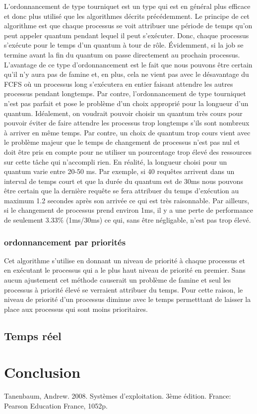 \documentclass{article}
\begin{document}
L'ordonnancement de type tourniquet est un type qui est en général plus efficace et donc plus utilisé que les algorithmes décrits précédemment. Le principe de cet algorithme est que chaque processus se voit attribuer une période de temps qu'on peut appeler quantum pendant lequel il peut s'exécuter. Donc, chaque processus s'exécute pour le temps d'un quantum à tour de rôle. Évidemment, si la job se termine avant la fin du quantum on passe directement au prochain processus. L'avantage de ce type d'ordonnancement est le fait que nous pouvons être certain qu'il n'y aura pas de famine et, en plus, cela ne vient pas avec le désavantage du FCFS où un processus long s'exécutera en entier faisant attendre les autres processus pendant longtemps. Par contre, l'ordonnancement de type tourniquet n'est pas parfait et pose le problème d'un choix approprié pour la longueur d'un quantum. Idéalement, on voudrait pouvoir choisir un quantum très cours pour pouvoir éviter de faire attendre les processus trop longtemps s'ils sont nombreux à arriver en même temps. Par contre, un choix de quantum trop cours vient avec le problème majeur que le temps de changement de processus n'est pas nul et doit être pris en compte pour ne utiliser un pourcentage trop élevé des ressources sur cette tâche qui n'accompli rien.
\newline
\newline
En réalité, la longueur choisi pour un quantum varie entre 20-50 ms. Par exemple, si 40 requêtes arrivent dans un interval de temps court et que la durée du quantum est de 30ms nous pouvons être certain que la dernière requête se fera attribuer du temps d'exécution au maximum 1.2 secondes après son arrivée ce qui est très raisonnable. Par ailleurs, si le changement de processus prend environ 1ms, il y a une perte de performance de seulement 3.33\% (1ms/30ms) ce qui, sans être négligable, n'est pas trop élevé.

\subsubsection{ordonnancement par priorités}

Cet algorithme s'utilise en donnant un niveau de priorité à chaque processus et en exécutant le processus qui a le plus haut niveau de priorité en premier. Sans aucun ajustement cet méthode causerait un problème de famine et seul les processus à priorité élevé se verraient attribuer du temps. Pour cette raison, le niveau de priorité d'un processus diminue avec le temps permetttant de laisser la place aux processus qui sont moins prioritaires.

\subsection{Temps réel}

\section{Conclusion}

\begin{thebibliography}{9}
Tanenbaum, Andrew. 2008. Systèmes d'exploitation. 3ème édition. France: Pearson Education France, 1052p.
\end{thebibliography}
\end{document}
